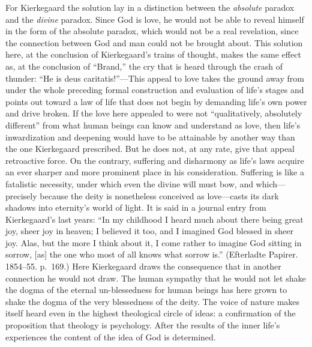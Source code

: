 \documentclass[12pt,a4paper]{book}
\newcommand{\opage}[1]{\marginnote{\footnotesize\textit{[#1]}}}
\begin{document}
For Kierkegaard the solution lay in a distinction between the
\textit{absolute} paradox and the \textit{divine} paradox. Since God is
love, he would not be able to reveal himself in the form of the absolute
paradox, which would not be a real revelation, since the connection
between God and man could not be brought about. This solution here, at
the conclusion of Kierkegaard's trains of thought, makes the same effect
as, at the conclusion of ``Brand,'' the cry that is heard through the
crash of thunder: ``He is deus caritatis!''---This appeal to love takes
the ground away from under the whole preceding formal construction and
evaluation of life's stages and points out toward a law of life that does
not begin by demanding life's own power and drive broken. If the love
here appealed
to were not ``qualitatively, absolutely different'' from what human
beings can know and understand as love, then life's inwardization and
deepening would have to be attainable by another way than the one
Kierkegaard prescribed. But he does not, at any rate, give that appeal
retroactive force. On the contrary, suffering and disharmony as life's
laws acquire an ever sharper and more prominent place in his
consideration. Suffering is like a fatalistic necessity, under which
even the divine will must bow, and which---precisely because the deity
is nonetheless conceived as love---casts its dark shadows into
eternity's world of light. It is said in a journal entry from
Kierkegaard's last years: ``In my
\opage{126}childhood I heard much about there being great joy, sheer joy
in heaven; I believed it too, and I imagined God blessed in sheer joy.
Alas, but the more I think about it, I come rather to imagine God
sitting in sorrow, [as] the one who most of all knows what sorrow is.''
(Efterladte Papirer. 1854--55. p.~169.) Here Kierkegaard draws the
consequence that in another connection he would not draw. The human
sympathy that he would not let shake the dogma of the eternal
un-blessedness for human beings has here grown to shake the dogma of the
very blessedness of the deity. The voice of nature makes itself heard
even in the highest theological circle of ideas: a confirmation of the
proposition that theology is psychology. After the results of the inner
life's experiences the content of the idea of God is determined.
\end{document}
